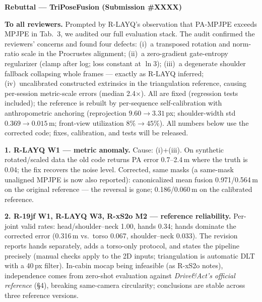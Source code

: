 \documentclass[10pt,a4paper]{article}
\newcommand{\head}[1]{\vspace{2pt}\textbf{#1}\;}
\begin{document}
\begin{center}\textbf{Rebuttal --- TriPoseFusion (Submission \#XXXX)}\end{center}
\vspace{-2pt}

\head{To all reviewers.}
Prompted by R-LAYQ's observation that PA-MPJPE exceeds MPJPE in Tab.~3, we audited our full evaluation stack. The audit confirmed the reviewers' concerns and found four defects: (i)~a transposed rotation and norm-ratio scale in the Procrustes alignment; (ii)~a zero-gradient gate-entropy regularizer (clamp after log; loss constant at $\ln 3$); (iii)~a degenerate shoulder fallback collapsing whole frames --- exactly as R-LAYQ inferred; (iv)~uncalibrated constructed extrinsics in the triangulation reference, causing per-session metric-scale errors (median 2.4$\times$). All are fixed (regression tests included); the reference is rebuilt by per-sequence self-calibration with anthropometric anchoring (reprojection $9.60\!\to\!3.31$\,px; shoulder-width std $0.369\!\to\!0.015$\,m; front-view utilization $8\%\!\to\!45\%$). All numbers below use the corrected code; fixes, calibration, and tests will be released.

\head{1. R-LAYQ W1 --- metric anomaly.}
Cause: (i)+(iii). On synthetic rotated/scaled data the old code returns PA error 0.7--2.4\,m where the truth is 0.04; the fix recovers the noise level. Corrected, same masks (a same-mask unaligned MPJPE is now also reported): canonicalized mean fusion 0.971/0.564\,m on the original reference --- the reversal is gone; 0.186/0.060\,m on the calibrated reference.

\head{2. R-19jf W1, R-LAYQ W3, R-xS2o M2 --- reference reliability.}
Per-joint valid rates: head/shoulder--neck 1.00, hands 0.34; hands dominate the corrected error (0.316\,m vs.\ torso 0.067, shoulder--neck 0.033). The revision reports hands separately, adds a torso-only protocol, and states the pipeline precisely (manual checks apply to the 2D inputs; triangulation is automatic DLT with a 40\,px filter). In-cabin mocap being infeasible (as R-xS2o notes), independence comes from zero-shot evaluation against \emph{Drive\&Act's official reference} (\S4), breaking same-camera circularity; conclusions are stable across three reference versions.
\end{document}
